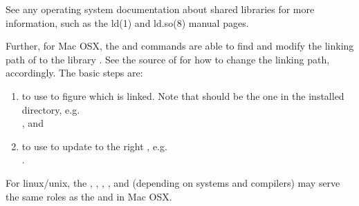 \begin{enumerate}
\begin{Code}
See any operating system documentation about shared libraries for
more information, such as the ld(1) and ld.so(8) manual pages.
\end{Code}
    Further, for Mac OSX, the  and 
    commands are able to find and modify the linking path of 
    to the library .
    See the source of
     for how to change the linking path,
    accordingly. The basic steps are:
    \begin{enumerate}
    \item to use  to figure which
           is linked. Note that 
          should be the one in the installed directory, e.g. \\
          ,
          and
    \item to use 
          to update to the right , e.g. \\
          .
    \end{enumerate}
    For linux/unix, the , , ,
    , and  (depending on systems and
    compilers) may serve the same roles as the  and
     in Mac OSX.
\end{enumerate}
